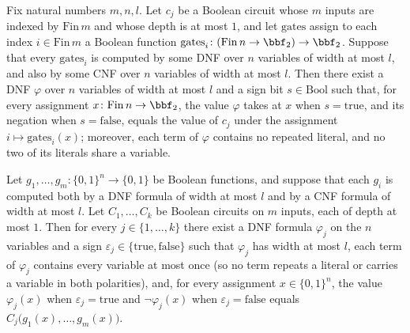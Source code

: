 \begin{lemma}
\label{LMN.child_depth_le1_has_signed_dnf}
\leanok
{}
Fix natural numbers $m,n,l$. Let $c_j$ be a Boolean circuit whose $m$ inputs are indexed
by $\mathrm{Fin}\,m$ and whose depth is at most $1$, and let $\mathrm{gates}$ assign to
each index $i \in \mathrm{Fin}\,m$ a Boolean function $\mathrm{gates}_i \colon
(\mathrm{Fin}\,n \to \bbf_2) \to \bbf_2$. Suppose that every $\mathrm{gates}_i$ is
computed by some DNF over $n$ variables of width at most $l$, and also by some CNF over
$n$ variables of width at most $l$. Then there exist a DNF $\varphi$ over $n$ variables
of width at most $l$ and a sign bit $s \in \mathrm{Bool}$ such that, for every
assignment $x \colon \mathrm{Fin}\,n \to \bbf_2$, the value $\varphi$ takes at $x$ when
$s = \mathrm{true}$, and its negation when $s = \mathrm{false}$, equals the value of
$c_j$ under the assignment $i \mapsto \mathrm{gates}_i(x)$; moreover, each term of
$\varphi$ contains no repeated literal, and no two of its literals share a variable.
\end{lemma}

\begin{lemma}
\label{LMN.list_child_signed_dnfs}
\leanok
{}
Let $g_1,\dots,g_m \colon \{0,1\}^n \to \{0,1\}$ be Boolean functions, and suppose that
each $g_i$ is computed both by a DNF formula of width at most $l$ and by a CNF formula
of width at most $l$. Let $C_1,\dots,C_k$ be Boolean circuits on $m$ inputs, each of
depth at most $1$. Then for every $j \in \{1,\dots,k\}$ there exist a DNF formula
$\varphi_j$ on the $n$ variables and a sign $\varepsilon_j \in
\{\mathrm{true},\mathrm{false}\}$ such that $\varphi_j$ has width at most $l$, each term
of $\varphi_j$ contains every variable at most once (so no term repeats a literal or
carries a variable in both polarities), and, for every assignment $x \in \{0,1\}^n$, the
value $\varphi_j(x)$ when $\varepsilon_j = \mathrm{true}$ and $\lnot\varphi_j(x)$ when
$\varepsilon_j = \mathrm{false}$ equals $C_j\bigl(g_1(x),\dots,g_m(x)\bigr)$.
\end{lemma}

